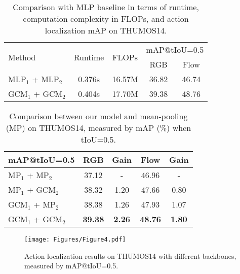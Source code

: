 \documentclass[10pt,journal,compsoc]{IEEEtran}
\begin{document}
	\begin{table}[!t]
	\centering
	\caption{Comparison with MLP baseline in terms of runtime, computation complexity in FLOPs, and action localization mAP on THUMOS14. }
	\begin{tabular}{l|c|c|cc}
		\hline
		\multirow{2}{*}{Method} & \multirow{2}{*}{Runtime} & \multirow{2}{*}{FLOPs} & \multicolumn{2}{c}{mAP@tIoU=0.5} \\ \cline{4-5} 
		&                          &                        & RGB        & Flow       \\ \hline
		MLP$_1$ + MLP$_2$         & 0.376s                  & 16.57M                 & 36.82       & 46.74       \\
		GCM$_1$ + GCM$_2$                   & 0.404s                  & 17.70M                 & 39.38       & 48.76       \\ \hline
	\end{tabular}
	\label{tab:runtime}
\end{table}	

		\begin{table}[!tb]
		\centering
		\caption{Comparison between our model and mean-pooling (MP) on THUMOS14, measured by mAP (\%) when tIoU=0.5.}
		\begin{tabular}{l|cc|cc}
			\hline
			mAP@tIoU=0.5                & RGB     & Gain      & Flow     & Gain        \\ \hline
			MP$_1$ + MP$_2$        & 37.12      & -       & 46.96  & -\\
			MP$_1$ + GCM$_2$  & 38.32   & 1.20       & 47.66 & 0.80 \\
			GCM$_1$ + MP$_2$  & 38.38   & 1.26        & 47.93  & 1.07 \\
			GCM$_1$ + GCM$_2$   & \textbf{39.38}   & \textbf{2.26}       & \textbf{48.76}  &  \textbf{1.80}\\ \hline
		\end{tabular}
		\label{Tab:mean-pooling}
	\end{table} 
	

	
				\begin{figure}[!tb]
		\centering
		\texttt{[image: Figures/Figure4.pdf]}
		\caption{Action localization results on THUMOS14 with different backbones, measured by mAP@tIoU=0.5.}
		\label{Fig:instantiations}
	\end{figure}
\end{document}
